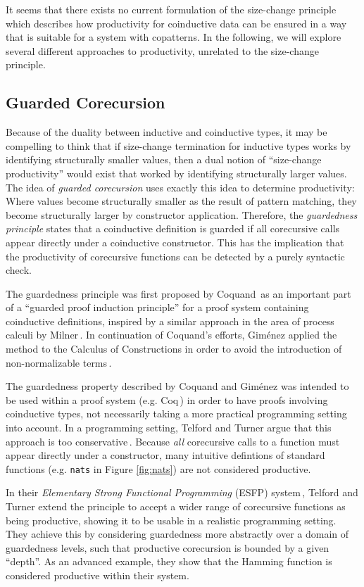 It seems that there exists no current formulation of the size-change principle which describes how productivity for coinductive data can be ensured in a way that is suitable for a system with copatterns. In the following, we will explore several different approaches to productivity, unrelated to the size-change principle.

\subsection{Guarded Corecursion}
Because of the duality between inductive and coinductive types, it may be compelling to think that if size-change termination for inductive types works by identifying structurally smaller values, then a dual notion of ``size-change productivity'' would exist that worked by identifying structurally larger values. The idea of \emph{guarded corecursion} uses exactly this idea to determine productivity: Where values become structurally smaller as the result of pattern matching, they become structurally larger by constructor application. Therefore, the \emph{guardedness principle} states that a coinductive definition is guarded if all corecursive calls appear directly under a coinductive constructor. This has the implication that the productivity of corecursive functions can be detected by a purely syntactic check. 

The guardedness principle was first proposed by Coquand\,\citep{Coquand94} as an important part of a ``guarded proof induction principle'' for a proof system containing coinductive definitions, inspired by a similar approach in the area of process calculi by Milner\,\citep{Milner82}. In continuation of Coquand's efforts, Gim\'{e}nez applied the method to the Calculus of Constructions in order to avoid the introduction of non-normalizable terms\,\citep{Gimenez95}. 

The guardedness property described by Coquand and Gim\'{e}nez was intended to be used within a proof system (e.g. Coq\,\citep{Coq:manual}) in order to have proofs involving coinductive types, not necessarily taking a more practical programming setting into account. In a programming setting, Telford and Turner argue that this approach is too conservative\,\citep{Telford98ensuringthe}. Because \emph{all} corecursive calls to a function must appear directly under a constructor, many intuitive defintions of standard functions (e.g. \texttt{nats} in Figure \ref{fig:nats}) are not considered productive.

In their \emph{Elementary Strong Functional Programming} (ESFP) system\,\citep{Telford97ensuringstreams,Telford98ensuringthe}, Telford and Turner extend the principle to accept a wider range of corecursive functions as being productive, showing it to be usable in a realistic programming setting. They achieve this by considering guardedness more abstractly over a domain of guardedness levels, such that productive corecursion is bounded by a given ``depth''. As an advanced example, they show that the Hamming function is considered productive within their system.


